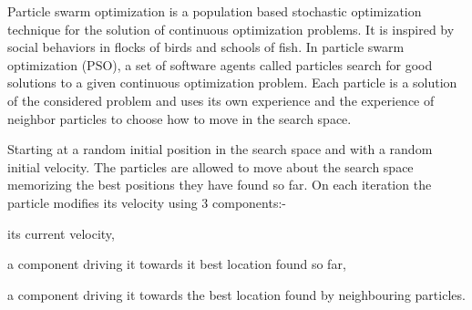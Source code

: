 

Particle swarm optimization \citep{kennedy95particle} is a population based stochastic optimization technique for the solution of continuous optimization problems. It is inspired by social behaviors in flocks of birds and schools of fish. In particle swarm optimization (PSO), a set of software agents called particles search for good solutions to a given continuous optimization problem. Each particle is a solution of the considered problem and uses its own experience and the experience of neighbor particles to choose how to move in the search space. 

Starting at a random initial position in the search space and with a random initial velocity. The particles are allowed to move about the search space memorizing the best positions they have found so far. On each iteration the particle modifies its velocity using 3 components:-  \begin{inparaenum} \item its current velocity, \item a component driving it towards it best location found so far, \item a component driving it towards the best location found by neighbouring particles.\end{inparaenum}


